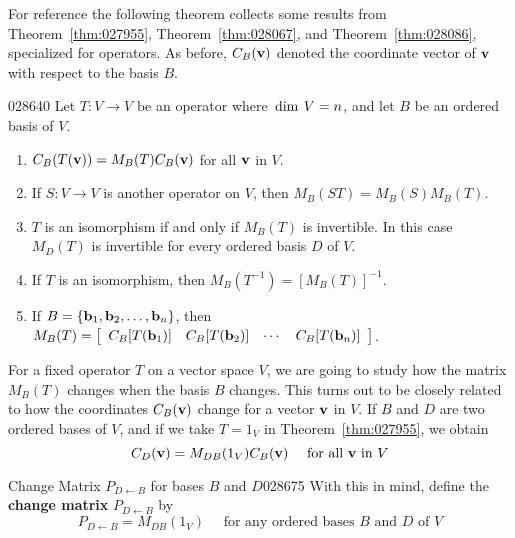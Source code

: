 For reference the following theorem collects some results from Theorem~\ref{thm:027955}, Theorem~\ref{thm:028067}, and Theorem~\ref{thm:028086}, specialized for operators. As before, $C_{B}(\textbf{v})$ denoted the coordinate vector of $\textbf{v}$ with respect to the basis $B$.


\begin{theorem}{}{028640}
Let $T : V \to V$ be an operator where $\thinspace\operatorname{dim \medspace}V = n$, and let $B$ be an ordered basis of $V$.


\begin{enumerate}
\item $C_{B}(T(\textbf{v})) = M_{B}(T)C_{B}(\textbf{v})$ for all $\textbf{v}$ in $V$.

\item If $S : V \to V$ is another operator on $V$, then $M_{B}(ST) = M_{B}(S)M_{B}(T)$.

\item $T$ is an isomorphism if and only if $M_{B}(T)$ is invertible. In this case $M_{D}(T)$ is invertible for every ordered basis $D$ of $V$.

\item If $T$ is an isomorphism, then $M_{B}(T^{-1}) = [M_{B}(T)]^{-1}$.

\item If $B = \{\textbf{b}_{1}, \textbf{b}_{2}, \dots, \textbf{b}_{n}\}$, then $M_B(T) = \left[ \begin{array}{cccc} C_B[T(\textbf{b}_1)] & C_B[T(\textbf{b}_2)] & \cdots & C_B[T(\textbf{b}_n)] \end{array} \right]$.

\end{enumerate}
\end{theorem}

For a fixed operator $T$ on a vector space $V$, we are going to study how the matrix $M_{B}(T)$ changes when the basis $B$ changes. This turns out to be closely related to how the coordinates $C_{B}(\textbf{v})$ change for a vector $\textbf{v}$ in $V$. If $B$ and $D$ are two ordered bases of $V$, and if we take $T = 1_{V}$ in Theorem~\ref{thm:027955}, we obtain
\begin{equation*}
C_D(\textbf{v}) = M_{DB}(1_V)C_B(\textbf{v}) \quad \mbox{ for all } \textbf{v} \mbox{ in } V
\end{equation*}
\begin{definition}{Change Matrix $P_{D \gets B}$ for bases $B$ and $D$}{028675}
With this in mind, define the \textbf{change matrix} $P_{D \gets B}$ by
\begin{equation*}
P_{D \gets B} = M_{DB}(1_V) \quad \mbox{ for any ordered bases } B \mbox{ and } D \mbox{ of } V
\end{equation*}
\end{definition}

